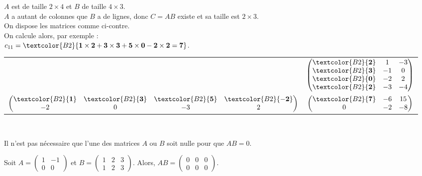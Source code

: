 \documentclass{cornouaille}
\begin{document}
\begin{methode}
\begin{exercice}
\begin{solution}
\begin{minipage}{0.5\linewidth}
$A$ est de taille $2\times4$ et $B$ de taille $4\times3$.\\
$A$ a autant de colonnes que $B$ a de lignes, donc $C=AB$ existe et sa taille est $2\times3$.\\
On dispose les matrices comme ci-contre.\\
On calcule alors, par exemple :\\
$c_{11}=\textcolor{B2}{\mathbf{1\times2+3\times3+5\times0-2\times2=7}}$.
\end{minipage}
\hfill
\begin{minipage}{0.45\linewidth}
\begin{tabular}{cc}
 & $\begin{pmatrix}
\textcolor{B2}{\mathbf{2}} & 1  & -3 \\
\textcolor{B2}{\mathbf{3}} &  -1 & 0 \\
\textcolor{B2}{\mathbf{0}} & -2 & 2 \\
\textcolor{B2}{\mathbf{2}} & -3 & -4
\end{pmatrix}$\\
$\begin{pmatrix}
\textcolor{B2}{\mathbf{1}} &  \textcolor{B2}{\mathbf{3}} & \textcolor{B2}{\mathbf{5}} & \textcolor{B2}{\mathbf{-2}} \\
-2 & 0 & -3 & 2
\end{pmatrix}$ & $\begin{pmatrix}
\textcolor{B2}{\mathbf{7}} & -6  & 15 \\
0 &  -2 & -8 \\
\end{pmatrix}$
\end{tabular}\\
\end{minipage}
\end{solution}
\end{exercice}
\end{methode}

\begin{remarque}
Il n'est pas nécessaire que l'une des matrices $A$ ou $B$ soit nulle pour que $AB\!=\!0$.
\end{remarque}

\begin{exemple}
Soit $A=\begin{pmatrix}1 & -1 \\ 0 & 0\end{pmatrix}$ et $B=\begin{pmatrix}1 & 2 & 3 \\ 1 & 2 & 3\end{pmatrix}$. Alors, $AB=\begin{pmatrix}0 & 0 & 0 \\ 0 & 0 & 0\end{pmatrix}$.
\end{exemple}
\end{document}
